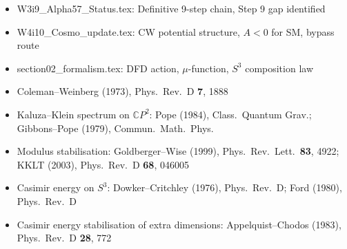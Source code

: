 \documentclass[11pt,a4paper]{article}
\newcommand{\CP}{\mathbb{C}P}
\begin{document}
\begin{itemize}[nosep]
\item W3i9\_Alpha57\_Status.tex: Definitive 9-step chain, Step 9 gap identified
\item W4i10\_Cosmo\_update.tex: CW potential structure, $A < 0$ for SM, bypass route
\item section02\_formalism.tex: DFD action, $\mu$-function, $S^3$ composition law
\item Coleman--Weinberg (1973), Phys.\ Rev.\ D \textbf{7}, 1888
\item Kaluza--Klein spectrum on $\CP^2$: Pope (1984), Class.\ Quantum Grav.;
  Gibbons--Pope (1979), Commun.\ Math.\ Phys.
\item Modulus stabilisation: Goldberger--Wise (1999), Phys.\ Rev.\ Lett.\
  \textbf{83}, 4922; KKLT (2003), Phys.\ Rev.\ D \textbf{68}, 046005
\item Casimir energy on $S^3$: Dowker--Critchley (1976), Phys.\ Rev.\ D;
  Ford (1980), Phys.\ Rev.\ D
\item Casimir energy stabilisation of extra dimensions: Appelquist--Chodos
  (1983), Phys.\ Rev.\ D \textbf{28}, 772
\end{itemize}
\end{document}
